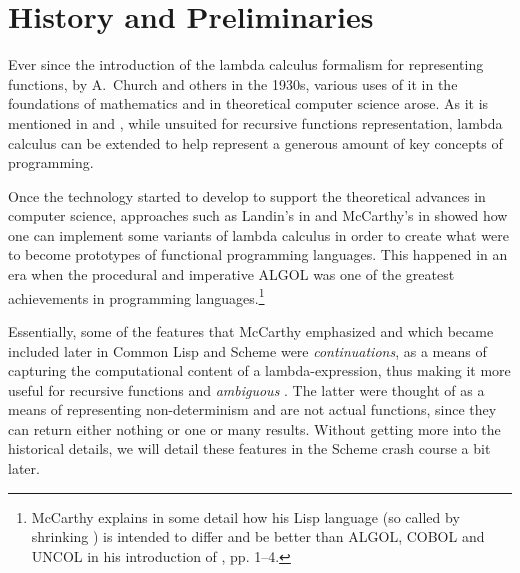 
\chapter{History and Preliminaries}

Ever since the introduction of the lambda calculus formalism for representing
functions, by A.\ Church and others in the 1930s, various uses of it in the
foundations of mathematics and in theoretical computer science arose. As it
is mentioned in \cite{mccarthy61} and \cite{mccarthy62}, while unsuited for
recursive functions representation, lambda calculus can be extended to help
represent a generous amount of key concepts of programming.

Once the technology started to develop to support the theoretical advances
in computer science, approaches such as Landin's in \cite{Landin1964TheME}
and McCarthy's in \cite{mccarthy60} showed how one can 
implement some variants of lambda calculus in order to create what were to
become prototypes of functional programming languages. This happened in an
era when the procedural and imperative ALGOL was one of the greatest
achievements in programming languages.\footnote{McCarthy explains in some
  detail how his Lisp language (so called by shrinking )
  is intended to differ and be better than ALGOL, COBOL and UNCOL in his
  introduction of \cite{mccarthy61}, pp. 1--4.}

Essentially, some of the features that McCarthy emphasized and which became
included later in Common Lisp and Scheme were \emph{continuations}, as a means
of capturing the computational content of a lambda-expression, thus making it
more useful for recursive functions and \emph{ambiguous }. The
latter were thought of as a means of representing non-determinism and
are not actual functions, since they can return either nothing or one or
many results. Without getting more into the historical details, we will
detail these features in the Scheme crash course a bit later.

